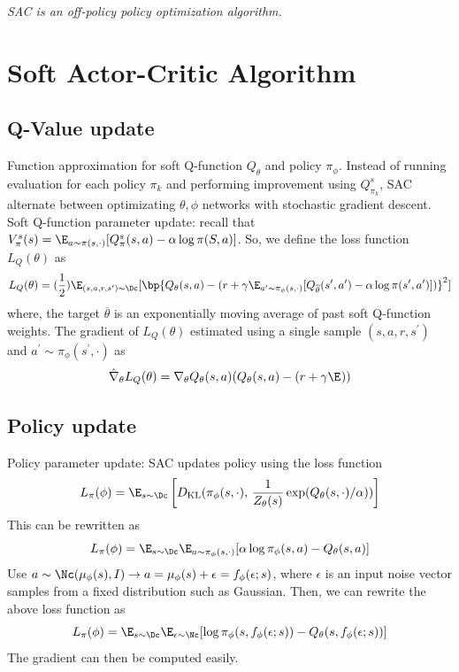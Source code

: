 \noindent \textit{SAC is an off-policy policy optimization algorithm.}

\section{Soft Actor-Critic Algorithm}
\subsection{Q-Value update}
Function approximation for soft Q-function $Q_\theta$ and policy $\pi_\phi$. Instead of running evaluation for each policy $\pi_k$ and performing
improvement using $Q_{\pi_k}^s$, SAC alternate between optimizating $\theta, \phi$ networks with stochastic gradient descent. \\

\noindent Soft Q-function parameter update: recall that $V_\pi^s(s) = \E_{a\sim\pi(s,\cdot)}[Q_\pi^s(s, a) - \alpha \log \pi(S, a)]$. So, we define the loss function $L_Q(\theta)$ as
\[
  L_Q(\theta) = (\frac{1}{2})\E_{(s,a,r,s^{\prime})\sim\Dc} [\bp{Q_\theta(s,a) - (r + \gamma \E_{a^{\prime} \sim \pi_\phi(s, \cdot)}[Q_{\overline{\theta}}(s^{\prime}, a^{\prime}) - \alpha \log \pi(s^{\prime}, a^{\prime})])}^2]
\]
where, the target $\overline{\theta}$ is an exponentially moving average of past soft Q-function weights. The gradient of $L_Q(\theta)$ estimated using a single sample $(s, a, r, s^{\prime})$ and $a^{\prime}\sim\pi_\phi(s^{\prime}, \cdot)$ as
\[
  \hat{\nabla}_\theta L_Q(\theta) = \nabla_\theta Q_\theta(s, a)(Q_\theta(s,a) - (r + \gamma \E_{})) %
\]

\subsection{Policy update}
Policy parameter update: SAC updates policy using the loss function
\[
  L_\pi(\phi) = \E_{s\sim\Dc} \left[ D_{\text{KL}}(\pi_\phi(s, \cdot), \, \frac{1}{Z_\theta(s)} \exp(Q_\theta(s, \cdot) / \alpha)) \right]
\]
This can be rewritten as
\[
  L_\pi(\phi) = \E_{s\sim\Dc}\E_{a \sim\pi_\phi(s, \cdot)} [ \alpha \log \pi_\phi(s, a) - Q_\theta(s, a)]
\]
Use $a \sim \Nc(\mu_\phi(s), I) \rightarrow a = \mu_\phi(s) + \epsilon = f_\phi(\epsilon; s)$, where $\epsilon$ is an input noise vector samples from a fixed distribution such as Gaussian. Then,
we can rewrite the above loss function as
\[
  L_\pi(\phi) = \E_{s \sim \Dc} \E_{\epsilon \sim \Nc}[\log \pi_\phi(s, f_\phi(\epsilon; s)) - Q_\theta(s, f_\phi(\epsilon; s))]
\]
The gradient can then be computed easily.

